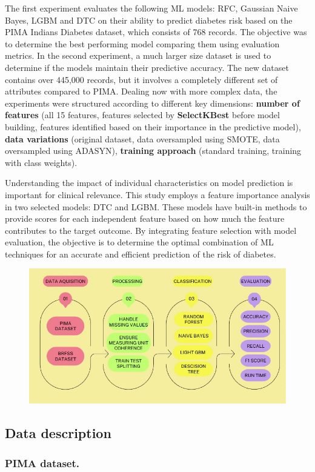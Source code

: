 \documentclass[runningheads]{llncs}
\begin{document}
The first experiment evaluates the following ML models: RFC, Gaussian Naive Bayes, LGBM and DTC on their ability to predict diabetes risk based on the PIMA Indians Diabetes dataset, which consists of 768 records. The objective was to determine the best performing model comparing them using evaluation metrics. 
In the second experiment, a much larger size dataset is used to determine if the models maintain their predictive accuracy. The new dataset contains over 445,000 records, but it involves a completely different set of attributes compared to PIMA. Dealing now with more complex data, the experiments were structured according to different key dimensions:  \textbf{number of features} (all 15 features, features selected by \textbf{SelectKBest} before model building, features identified based on their importance in the predictive model), 
\textbf{data variations} (original dataset, data oversampled using SMOTE, data oversampled using ADASYN), 
\textbf{training approach} (standard training, training with class weights).


Understanding the impact of individual characteristics on model prediction is important for clinical relevance. This study employs a feature importance analysis in two selected models: DTC and LGBM. These models have built-in methods to provide scores for each independent feature based on how much the feature contributes to the target outcome. 
By integrating feature selection with model evaluation, the objective is to determine the optimal combination of ML techniques for an accurate and efficient prediction of the risk of diabetes.


\begin{figure}[htbp]
\centering
    \includegraphics[width=0.5\linewidth]{images/steps.jpg}
    \label{algorithm}
\end{figure}


\subsection{Data description}
\label{section:dataDescription}
\subsubsection{PIMA dataset.}
\end{document}
